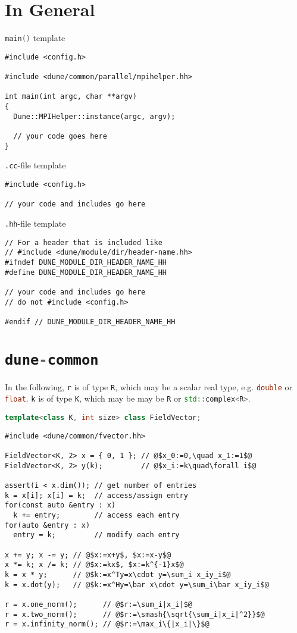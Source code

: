 \documentclass[11pt,DIV=13]{scrartcl}
\def\cxx{\lstinline[language=C++]}
\def\sh{\lstinline[language=sh]}
\begin{document}
\section*{In General}

\cxx{main()} template
\begin{lstlisting}
#include <config.h>

#include <dune/common/parallel/mpihelper.hh>

int main(int argc, char **argv)
{
  Dune::MPIHelper::instance(argc, argv);

  // your code goes here
}
\end{lstlisting}

\sh{.cc}-file template
\begin{lstlisting}
#include <config.h>

// your code and includes go here
\end{lstlisting}

\sh{.hh}-file template
\begin{lstlisting}
// For a header that is included like
// #include <dune/module/dir/header-name.hh>
#ifndef DUNE_MODULE_DIR_HEADER_NAME_HH
#define DUNE_MODULE_DIR_HEADER_NAME_HH

// your code and includes go here
// do not #include <config.h>

#endif // DUNE_MODULE_DIR_HEADER_NAME_HH
\end{lstlisting}

\section*{\cxx{dune-common}}

In the following, \cxx{r} is of type \cxx{R}, which may be a scalar real type,
e.g. \cxx{double} or \cxx{float}.  \cxx{k} is of type \cxx{K}, which may be
may be \cxx{R} or \cxx{std::complex<R>}.

\cxx{template<class K, int size> class FieldVector;}
\begin{lstlisting}
#include <dune/common/fvector.hh>

FieldVector<K, 2> x = { 0, 1 }; // @$x_0:=0,\quad x_1:=1$@
FieldVector<K, 2> y(k);         // @$x_i:=k\quad\forall i$@

assert(i < x.dim()); // get number of entries
k = x[i]; x[i] = k;  // access/assign entry
for(const auto &entry : x)
  k += entry;        // access each entry
for(auto &entry : x)
  entry = k;         // modify each entry

x += y; x -= y; // @$x:=x+y$, $x:=x-y$@
x *= k; x /= k; // @$x:=kx$, $x:=k^{-1}x$@
k = x * y;      // @$k:=x^Ty=x\cdot y=\sum_i x_iy_i$@
k = x.dot(y);   // @$k:=x^Hy=\bar x\cdot y=\sum_i\bar x_iy_i$@

r = x.one_norm();      // @$r:=\sum_i|x_i|$@
r = x.two_norm();      // @$r:=\smash{\sqrt{\sum_i|x_i|^2}}$@
r = x.infinity_norm(); // @$r:=\max_i\{|x_i|\}$@
\end{lstlisting}
\end{document}
